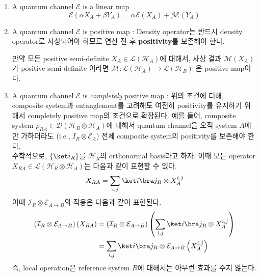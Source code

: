 \begin{enumerate}
    \item A quantum channel $\mathcal E$ is a linear map
    \begin{equation}
        \mathcal{E}\left(\alpha X_A+\beta Y_A\right)=\alpha \mathcal{E}\left(X_A\right)+\beta \mathcal{E}\left(Y_A\right)
    \end{equation}
    \item A quantum channel $\mathcal E$ is positive map : Density operator는 반드시 density operator로 사상되어야 하므로 연산 전 후 \textbf{positivity}를 보존해야 한다.
    \begin{definition}
        만약 모든 positive semi-definite $X_A \in \mathcal{L}\left(\mathcal{H}_A\right)$에 대해서, 사상 결과 $\mathcal{M}\left(X_A\right)$가 positive semi-definite 이라면 $\mathcal{M}: \mathcal{L}\left(\mathcal{H}_A\right) \rightarrow \mathcal{L}\left(\mathcal{H}_B\right)$ 은 positive map이다. 
    \end{definition}
    \item A quantum channel $\mathcal E$ is \textit{completely} positive map : 위의 조건에 더해, composite system과 entanglement를 고려해도 여전히 positivity를 유지하기 위해서 completely positive map의 조건으로 확장된다. 
    예를 들어, composite system $\rho_{RA} \in \mathcal D(\mathcal H_R \otimes \mathcal H_A)$에 대해서 quantum channel을 오직 system $A$에만 가하더라도 (i.e., $I_R \otimes \mathcal E_A$) 전체 composite system의 positivity를 보존해야 한다.\\
    수학적으로, $\{\ket i_R\}$를 $\mathcal H_R$의 orthonormal basis라고 하자. 이때 모든 operator $X_{RA} \in \mathcal L(\mathcal H_R \otimes \mathcal H_A)$는 다음과 같이 표현할 수 있다.
    \begin{equation*}
        X_{RA} = \sum_{i,j} \ket i \bra j_R \otimes X_A^{i,j}
    \end{equation*}
    이때 $\mathcal I_R \otimes \mathcal E_{A\rightarrow B}$의 작용은 다음과 같이 표현된다.
    \begin{align*}
        \left(\mathcal I_R \otimes \mathcal E_{A\rightarrow B}\right)\left(X_{R A}\right) &= \left(\mathcal I_R \otimes \mathcal E_{A\rightarrow B}\right)\left(\sum_{i,j} \ket i \bra j_R \otimes X_A^{i,j}\right) \\
        &= \sum_{i,j} \ket i \bra j_R \otimes \mathcal E_{A\rightarrow B}\left(X_A^{i, j}\right)
    \end{align*}
    즉, local operation은 reference system $R$에 대해서는 아무런 효과를 주지 않는다.
    \begin{definition}

\end{definition}
\end{enumerate}
